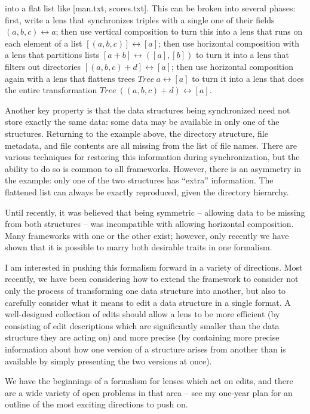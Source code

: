 \documentclass{article}
\newcommand{\lens}{\leftrightarrow}
\begin{document}
\noindent into a flat list like [man.txt, scores.txt]. This can be broken
into several phases: first, write a lens that synchronizes triples with a
single one of their fields $(a,b,c) \lens a$; then use vertical composition
to turn this into a lens that runs on each element of a list $[(a,b,c)]
\lens [a]$; then use horizontal composition with a lens that partitions
lists $[a+b] \lens ([a],[b])$ to turn it into a lens that filters out
directories $[(a,b,c)+d] \lens [a]$; then use horizontal composition again
with a lens that flattens trees $\mathit{Tree}\ a \lens [a]$ to turn it into
a lens that does the entire transformation $\mathit{Tree}\ ((a,b,c)+d) \lens
[a]$.

Another key property is that the data structures being synchronized need not
store exactly the same data: some data may be available in only one of the
structures. Returning to the example above, the directory structure, file
metadata, and file contents are all missing from the list of file names.
There are various techniques for restoring this information during
synchronization, but the ability to do so is common to all frameworks.
However, there is an asymmetry in the example: only one of the two
structures has ``extra'' information. The flattened list can always be
exactly reproduced, given the directory hierarchy.

Until recently, it was believed that being symmetric -- allowing data to be
missing from both structures -- was incompatible with allowing horizontal
composition. Many frameworks with one or the other exist; however, only
recently we have shown that it is possible to marry both desirable traits in
one formalism.

I am interested in pushing this formalism forward in a variety of
directions. Most recently, we have been considering how to extend the
framework to consider not only the process of transforming one data
structure into another, but also to carefully consider what it means to edit
a data structure in a single format. A well-designed collection of edits
should allow a lens to be more efficient (by consisting of edit descriptions
which are significantly smaller than the data structure they are acting on)
and more precise (by containing more precise information about how one
version of a structure arises from another than is available by simply
presenting the two versions at once).

We have the beginnings of a formalism for lenses which act on edits, and
there are a wide variety of open problems in that area -- see my one-year
plan for an outline of the most exciting directions to push on.
\end{document}
